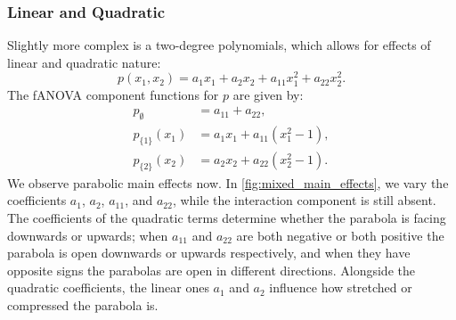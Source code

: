 \subsubsection{Linear and Quadratic}
Slightly more complex is a two-degree polynomials, which allows for effects of linear and quadratic nature:
\[
p(x_1, x_2) = a_1 x_1 + a_2 x_2 + a_{11} x_1^2 + a_{22} x_2^2.
\]
The fANOVA component functions for $p$ are given by:
\begin{align*}
    p_{\emptyset} &= a_{11} + a_{22}, \\
    p_{\{1\}}(x_1) &= a_1 x_1 + a_{11}(x_1^2 - 1), \\
    p_{\{2\}}(x_2) &= a_2 x_2 + a_{22}(x_2^2 - 1).
\end{align*}
We observe parabolic main effects now. In \autoref{fig:mixed_main_effects}, we vary the coefficients $a_1$, $a_2$, $a_{11}$, and $a_{22}$, while the interaction component is still absent.
The coefficients of the quadratic terms determine whether the parabola is facing downwards or upwards; when $a_{11}$ and $a_{22}$ are both negative or both positive the parabola is open downwards or upwards respectively, and when they have opposite signs the parabolas are open in different directions. Alongside the quadratic coefficients, the linear ones $a_1$ and $a_2$ influence how stretched or compressed the parabola is.

